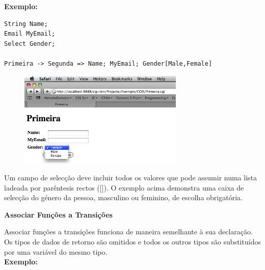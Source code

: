 \documentclass[a4paper]{article}
\begin{document}
\vspace{.2cm}
\textbf{Exemplo:}

\begin{small}
\begin{lstlisting}
String Name;
Email MyEmail;
Select Gender;

Primeira -> Segunda => Name; MyEmail; Gender[Male,Female]
\end{lstlisting}
\end{small}

\vspace{.2cm}

\begin{figure}[!ht]
\begin{center}
\includegraphics[width=0.7\textwidth]{./Images/Form2.png}
\end{center}
\end{figure}

\vspace{.2cm}

Um campo de selecção deve incluir todos os valores que pode assumir numa lista ladeada por parêntesis rectos ([]). O exemplo acima
demonstra uma caixa de selecção do género da pessoa, masculino ou feminino, de escolha obrigatória.\\

\begin{normalsize}
\textbf{Associar Funções a Transições}\\
\end{normalsize}

\hspace{1cm}Associar funções a transições funciona de maneira semelhante à sua declaração. Os tipos de dados de retorno são omitidos e
todos os outros tipos são substituídos por uma variável do mesmo tipo.\\

\textbf{Exemplo:}
\end{document}
